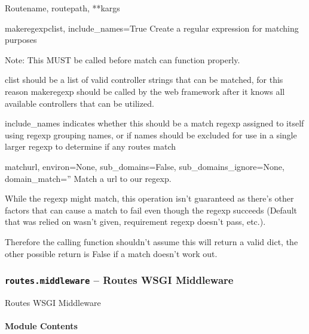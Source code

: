 \documentclass[letterpaper,10pt,english]{manual}
\begin{document}
\begin{classdesc}{Route}{name, routepath, **kargs}
\hypertarget{routes.route.Route.makeregexp}{}\begin{methoddesc}{makeregexp}{clist, include\_names=True}
Create a regular expression for matching purposes

Note: This MUST be called before match can function properly.

clist should be a list of valid controller strings that can be 
matched, for this reason makeregexp should be called by the web
framework after it knows all available controllers that can be
utilized.

include\_names indicates whether this should be a match regexp
assigned to itself using regexp grouping names, or if names
should be excluded for use in a single larger regexp to
determine if any routes match
\end{methoddesc}

\hypertarget{routes.route.Route.match}{}\begin{methoddesc}{match}{url, environ=None, sub\_domains=False, sub\_domains\_ignore=None, domain\_match=''}
Match a url to our regexp.

While the regexp might match, this operation isn't
guaranteed as there's other factors that can cause a match to
fail even though the regexp succeeds (Default that was relied
on wasn't given, requirement regexp doesn't pass, etc.).

Therefore the calling function shouldn't assume this will
return a valid dict, the other possible return is False if a
match doesn't work out.
\end{methoddesc}
\end{classdesc}

\resetcurrentobjects
\hypertarget{--doc-modules/middleware}{}

\subsubsection{\texttt{routes.middleware} -- Routes WSGI Middleware}
\hypertarget{module-routes.middleware}{}
\modulesynopsis{}
Routes WSGI Middleware


\paragraph{Module Contents}
\end{document}
